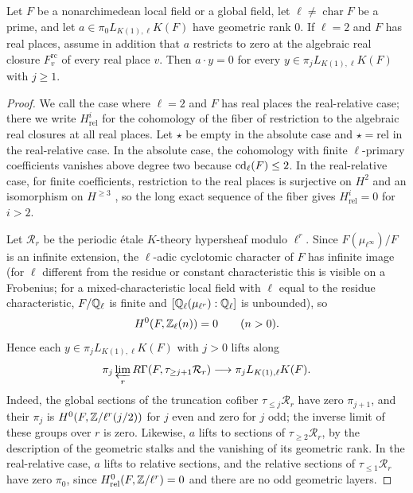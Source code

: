 \begin{lemma}\label{lem:paper-rank-zero-product}
Let $F$ be a nonarchimedean local field or a global field, let $\ell\ne\operatorname{char}F$ be a prime, and let $a\in\pi_0L_{K(1),\ell}K(F)$ have geometric rank $0$.
If $\ell=2$ and $F$ has real places, assume in addition that $a$ restricts to zero at the algebraic real closure $F_v^{\mathrm{rc}}$ of every real place $v$.
Then $a\cdot y=0$ for every $y\in\pi_jL_{K(1),\ell}K(F)$ with $j\ge1$.
\end{lemma}
\begin{proof}
We call the case where $\ell=2$ and $F$ has real places the real-relative case; there we write $H^i_{\mathrm{rel}}$ for the cohomology of the fiber of restriction to the algebraic real closures at all real places.
Let $\star$ be empty in the absolute case and $\star=\mathrm{rel}$ in the real-relative case.
In the absolute case, the cohomology with finite $\ell$-primary coefficients vanishes above degree two because $\operatorname{cd}_\ell(F)\le2$.
In the real-relative case, for finite coefficients, restriction to the real places is surjective on $H^2$ and an isomorphism on $H^{\ge3}$ \cite[I, Theorem 4.10(c) and Corollary 4.16]{MilneADT}, so the long exact sequence of the fiber gives $H^i_{\mathrm{rel}}=0$ for $i>2$.

Let $\mathcal R_r$ be the periodic \'etale $K$-theory hypersheaf modulo $\ell^r$.
Since $F(\mu_{\ell^\infty})/F$ is an infinite extension, the $\ell$-adic cyclotomic character of $F$ has infinite image (for $\ell$ different from the residue or constant characteristic this is visible on a Frobenius; for a mixed-characteristic local field with $\ell$ equal to the residue characteristic, $F/\mathbb Q_\ell$ is finite and $[\mathbb Q_\ell(\mu_{\ell^r}):\mathbb Q_\ell]$ is unbounded), so
\[
 H^0(F,\mathbb Z_\ell(n))=0\qquad(n>0).
\]
Hence each $y\in\pi_jL_{K(1),\ell}K(F)$ with $j>0$ lifts along
\[
 \pi_j\varprojlim_r R\Gamma(F,\tau_{\ge j+1}\mathcal R_r)
       \longrightarrow \pi_j L_{K(1),\ell}K(F).
\]
Indeed, the global sections of the truncation cofiber $\tau_{\le j}\mathcal R_r$ have zero $\pi_{j+1}$, and their $\pi_j$ is $H^0(F,\mathbb Z/\ell^r(j/2))$ for $j$ even and zero for $j$ odd; the inverse limit of these groups over $r$ is zero.
Likewise, $a$ lifts to sections of $\tau_{\ge2}\mathcal R_r$, by the description of the geometric stalks and the vanishing of its geometric rank.
In the real-relative case, $a$ lifts to relative sections, and the relative sections of $\tau_{\le1}\mathcal R_r$ have zero $\pi_0$, since $H^0_{\mathrm{rel}}(F,\mathbb Z/\ell^r)=0$ and there are no odd geometric layers.


\end{proof}
